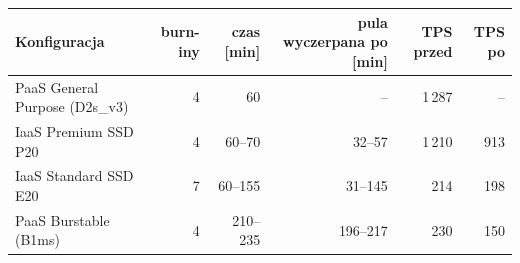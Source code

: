 \begin{tabular}{lrrrrr}
\toprule
Konfiguracja & burn-iny & czas [min] & pula wyczerpana po [min] & TPS przed & TPS po \\
\midrule
PaaS General Purpose (D2s\_v3) & 4 & 60 & -- & 1\,287 & -- \\
IaaS Premium SSD P20 & 4 & 60--70 & 32--57 & 1\,210 & 913 \\
IaaS Standard SSD E20 & 7 & 60--155 & 31--145 & 214 & 198 \\
PaaS Burstable (B1ms) & 4 & 210--235 & 196--217 & 230 & 150 \\
\bottomrule
\end{tabular}
